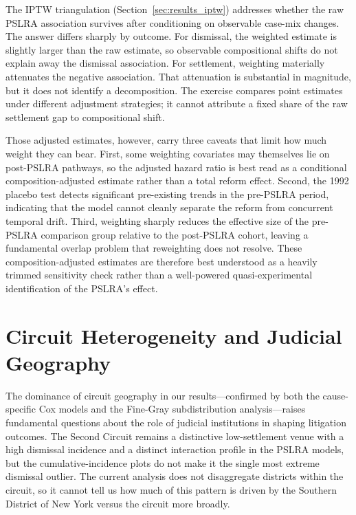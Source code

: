 The IPTW triangulation (Section~\ref{sec:results_iptw})
addresses whether the raw PSLRA association survives after
conditioning on observable case-mix changes. The answer
differs sharply by outcome. For dismissal, the weighted
estimate is slightly larger than the raw estimate, so
observable compositional shifts do not explain away the
dismissal association. For settlement, weighting materially
attenuates the negative association. That attenuation is
substantial in magnitude, but it does not identify a
decomposition. The exercise compares point estimates under
different adjustment strategies; it cannot attribute a fixed
share of the raw settlement gap to compositional shift.

Those adjusted estimates, however, carry three caveats that
limit how much weight they can bear. First, some weighting
covariates may themselves lie on post-PSLRA pathways, so the
adjusted hazard ratio is best read as a conditional
composition-adjusted estimate rather than a total reform
effect. Second, the 1992 placebo test
detects significant pre-existing trends in the pre-PSLRA
period, indicating that the model cannot cleanly separate the
reform from concurrent temporal drift. Third, weighting
sharply reduces the effective size of the pre-PSLRA
comparison group relative to the post-PSLRA cohort, leaving a
fundamental overlap problem that reweighting does not resolve.
These composition-adjusted estimates are therefore best
understood as a heavily trimmed sensitivity check rather than
a well-powered quasi-experimental identification of the
PSLRA's effect.

\section{Circuit Heterogeneity and Judicial Geography}

The dominance of circuit geography in our results---confirmed
by both the cause-specific Cox models and the Fine-Gray
subdistribution analysis---raises fundamental questions
about the role of judicial institutions in shaping litigation
outcomes. The Second Circuit remains a distinctive
low-settlement venue with a high dismissal incidence and a
distinct interaction profile in the PSLRA models, but the
cumulative-incidence plots do not make it the single most
extreme dismissal outlier. The current analysis does not
disaggregate districts within the circuit, so it cannot tell
us how much of this pattern is driven by the Southern
District of New York versus the circuit more broadly.

